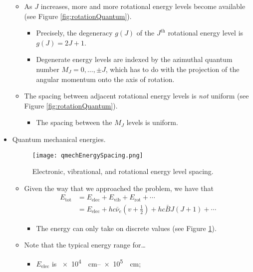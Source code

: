 \documentclass[../notes.tex]{subfiles}
\begin{document}
\begin{itemize}
\begin{itemize}
\begin{itemize}
        \end{itemize}
        \item As $J$ increases, more and more rotational energy levels become available (see Figure \ref{fig:rotationQuantum}).
        \begin{itemize}
            \item Precisely, the degeneracy $g(J)$ of the $J^\text{th}$ rotational energy level is $g(J)=2J+1$.
            \item Degenerate energy levels are indexed by the azimuthal quantum number $M_J=0,\dots,\pm J$, which has to do with the projection of the angular momentum onto the axis of rotation.
        \end{itemize}
        \item The spacing between adjacent rotational energy levels is \emph{not} uniform (see Figure \ref{fig:rotationQuantum}).
        \begin{itemize}
            \item The spacing between the $M_J$ levels is uniform.
        \end{itemize}
    \end{itemize}
    \item Quantum mechanical energies.
    \begin{figure}[H]
        \centering
        \texttt{[image: qmechEnergySpacing.png]}
        \caption{Electronic, vibrational, and rotational energy level spacing.}
        \label{fig:qmechEnergySpacing}
    \end{figure}
    \begin{itemize}
        \item Given the way that we approached the problem, we have that
        \begin{align*}
            E_\text{tot} &= E_\text{elec}+E_\text{vib}+E_\text{rot}+\cdots\\
            &= E_\text{elec}+hc\bar{\nu}_e\left( v+\frac{1}{2} \right)+hc\bar{B}J(J+1)+\cdots
        \end{align*}
        \begin{itemize}
            \item The energy can only take on discrete values (see Figure \ref{fig:qmechEnergySpacing}).
        \end{itemize}
        \item Note that the typical energy range for\dots
        \begin{itemize}
            \item $E_\text{elec}$ is \SIrange{e4}{e5}{\per\centi\meter};

\end{itemize}
\end{itemize}
\end{itemize}
\end{document}
